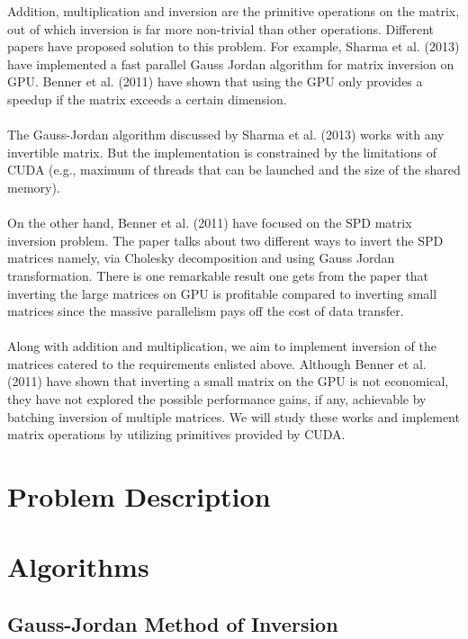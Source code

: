 \documentclass[11pt]{article}
\begin{document}
Addition, multiplication and inversion are the primitive operations on the matrix, out of which inversion is far more non-trivial than other operations. Different papers have proposed solution to this problem. For example, Sharma et al. (2013) have implemented a fast parallel Gauss Jordan algorithm for matrix inversion on GPU. Benner et al. (2011) have shown that using the GPU only provides a speedup if the matrix exceeds a certain dimension. \\\\
The Gauss-Jordan algorithm discussed by Sharma et al. (2013) works with any invertible matrix. But the implementation is constrained by the limitations of CUDA (e.g., maximum of threads that can be launched and the size of the shared memory).\\\\
On the other hand, Benner et al. (2011) have focused on the SPD matrix inversion problem. The paper talks about two different ways to invert the SPD matrices namely, via Cholesky decomposition and using Gauss Jordan transformation. There is one remarkable result one gets from the paper that inverting the large matrices on GPU is profitable compared to inverting small matrices since the massive parallelism pays off the cost of data transfer.\\\\
Along with addition and multiplication, we aim to implement inversion of the matrices catered to the requirements enlisted above. Although Benner et al. (2011) have shown that inverting a small matrix on the GPU is not economical, they have not explored the possible performance gains, if any, achievable by batching inversion of multiple matrices. We will study these works and implement matrix operations by utilizing primitives provided by CUDA.


\section{Problem Description}


\section{Algorithms}
\subsection{Gauss-Jordan Method of Inversion}
\end{document}
